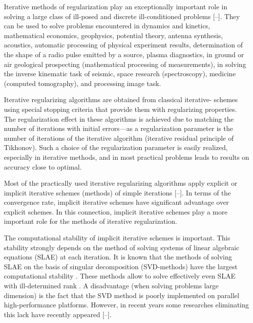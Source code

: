 Iterative methods of regularization play an exceptionally important role in solving a large class of ill-posed and discrete ill-conditioned problems [--]. They can be used to solve problems encountered in dynamics and kinetics, mathematical economics, geophysics, potential theory, antenna synthesis, acoustics, automatic processing of physical experiment results, determination of the shape of a radio pulse emitted by a source, plasma diagnostics, in ground or air geological prospecting (mathematical processing of measurements), in solving the inverse kinematic task of seismic, space research (spectroscopy), medicine (computed tomography), and processing image task.

Iterative regularizing algorithms are obtained from classical iterative- schemes using special stopping criteria that provide them with regularizing properties. The regularization effect in these algorithms is achieved due to matching the number of iterations with initial errors---as a regularization parameter is the number of iterations of the iterative algorithm (iterative residual principle of Tikhonov). Such a choice of the regularization parameter is easily realized, especially in iterative methods, and in most practical problems leads to results on accuracy close to optimal.

Most of the practically used iterative regularizing algorithms apply explicit or implicit iterative schemes (methods) of simple iterations [--]. In terms of the convergence rate, implicit iterative schemes have significant advantage over explicit schemes. In this connection, implicit iterative schemes play a more important role for the methods of iterative regularization.

The computational stability of implicit iterative schemes is important. This stability strongly depends on the method of solving systems of linear algebraic equations (SLAE) at each iteration. It is known that the methods of solving SLAE on the basis of singular decomposition (SVD-methods) have the largest computational stability \cite{zhdanov:bib:bb7, zhdanov:bib:bb8}. These methods allow to solve effectively even SLAE with ill-determined rank \cite{zhdanov:bib:bb9, zhdanov:bib:bb10}. A disadvantage (when solving problems large dimension) is the fact that the SVD method is poorly implemented on parallel high-performance platforms. However, in recent years some researches eliminating this lack have recently appeared [--].

